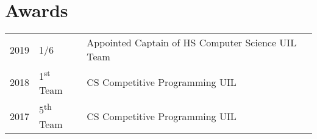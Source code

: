 \documentclass[letterpaper]{deedy-resume} %
\begin{document}
\begin{minipage}[t]{0.66\textwidth}
\section{Awards} 

\begin{tabular}{rll}
2019	 & 1/6 & Appointed Captain of HS Computer Science UIL Team\\
2018	 & 1\textsuperscript{st} Team & CS Competitive Programming UIL \\
2017	 & 5\textsuperscript{th} Team & CS Competitive Programming UIL\\
\end{tabular}

\sectionspace %

%
%
%


\end{minipage} %




\end{document}
